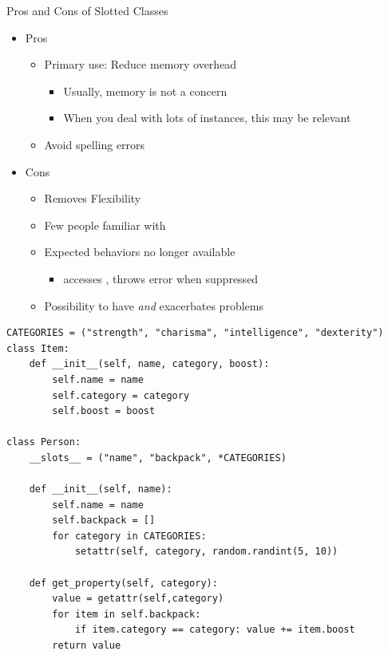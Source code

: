 \begin{frame}{Pros and Cons of Slotted Classes}
%
\begin{itemize}
\item Pros
	\begin{itemize}
	\item Primary use: Reduce memory overhead
		\begin{itemize}
		\item Usually, memory is not a concern
		\item When you deal with lots of instances, this may be relevant
		\end{itemize}
	\item Avoid spelling errors
	\end{itemize}
\item Cons
	\begin{itemize}
	\item Removes Flexibility
	\item Few people familiar with 
	\item Expected behaviors no longer available
		\begin{itemize}
		\item {} accesses , throws error when suppressed
		\end{itemize}
	\item Possibility to have  \emph{and}  exacerbates problems
	\end{itemize}
\end{itemize}
%
\end{frame}


\begin{frame}[fragile]
%
\begin{codebox}
\begin{verbatim}
CATEGORIES = ("strength", "charisma", "intelligence", "dexterity")
class Item:
    def __init__(self, name, category, boost):
        self.name = name
        self.category = category
        self.boost = boost

class Person:
    __slots__ = ("name", "backpack", *CATEGORIES)
    
    def __init__(self, name):
        self.name = name
        self.backpack = []        
        for category in CATEGORIES:
            setattr(self, category, random.randint(5, 10))

    def get_property(self, category):
        value = getattr(self,category)
        for item in self.backpack:
            if item.category == category: value += item.boost
        return value
\end{verbatim}
\end{codebox}
%
\end{frame}

